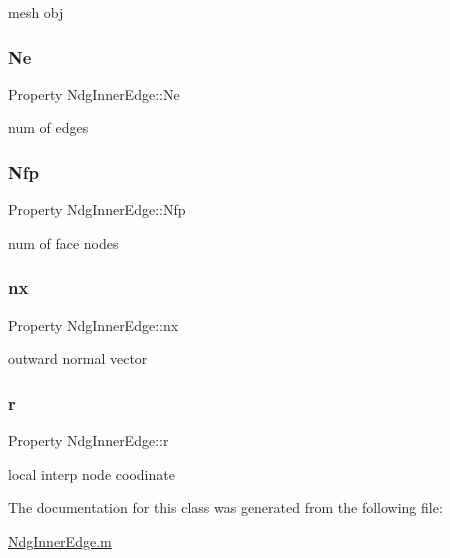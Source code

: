 mesh obj 

\mbox{\label{class_ndg_inner_edge_a203f9b68e29d46b8e0dd1d7c9d93de3d}} 
\subsubsection{\texorpdfstring{Ne}{Ne}}
{\footnotesize\ttfamily Property Ndg\+Inner\+Edge\+::\+Ne\hspace{0.3cm}{\ttfamily [protected]}}



num of edges 

\mbox{\label{class_ndg_inner_edge_a298ad4899897fba80c8cf847b1e1feaf}} 
\subsubsection{\texorpdfstring{Nfp}{Nfp}}
{\footnotesize\ttfamily Property Ndg\+Inner\+Edge\+::\+Nfp\hspace{0.3cm}{\ttfamily [protected]}}



num of face nodes 

\mbox{\label{class_ndg_inner_edge_afb749ea9b90c421eff467b6b9f8a9712}} 
\subsubsection{\texorpdfstring{nx}{nx}}
{\footnotesize\ttfamily Property Ndg\+Inner\+Edge\+::nx\hspace{0.3cm}{\ttfamily [protected]}}



outward normal vector 

\mbox{\label{class_ndg_inner_edge_a64fedc149792eb04fd88f33f83e9d591}} 
\subsubsection{\texorpdfstring{r}{r}}
{\footnotesize\ttfamily Property Ndg\+Inner\+Edge\+::r\hspace{0.3cm}{\ttfamily [protected]}}



local interp node coodinate 



The documentation for this class was generated from the following file\+:\begin{DoxyCompactItemize}
\item 
\hyperlink{_ndg_inner_edge_8m}{Ndg\+Inner\+Edge.\+m}\end{DoxyCompactItemize}
